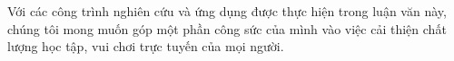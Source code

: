 \documentclass[a4paper, oneside, 13pt]{book}
\begin{document}
	Với các công trình nghiên cứu và ứng dụng được thực hiện trong luận văn này, chúng tôi mong muốn góp một phần công sức của mình vào việc cải thiện chất lượng học tập, vui chơi trực tuyến của mọi người.

\setlength{\parskip}{0mm}
\cleardoublepage

\tableofcontents
\listoffigures
\listoftables

\cleardoublepage


\pagestyle{fancy}
\setlength{\parskip}{2.5mm}

		



%








\setlength{\parskip}{0mm}

\cleardoublepage
\end{document}
